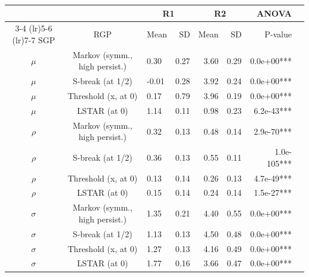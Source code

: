 \begin{table}[t]
\fontsize{8pt}{8pt}\selectfont
\begin{tabular*}{\linewidth}{@{\extracolsep{\fill}}cclrrrrl}
\toprule
 &  & \multicolumn{2}{c}{R1} & \multicolumn{2}{c}{R2} & ANOVA \\ 
\cmidrule(lr){3-4} \cmidrule(lr){5-6} \cmidrule(lr){7-7}
SGP & RGP & Mean & SD & Mean & SD & P-value \\ 
\midrule\addlinespace[2.5pt]
\ensuremath{\mu}   & Markov (symm., high persist.) & 0.30 & 0.27 & 3.60 & 0.29 & 0.0e+00*** \\ 
\ensuremath{\mu}   & S-break (at 1/2) & -0.01 & 0.28 & 3.92 & 0.24 & 0.0e+00*** \\ 
\ensuremath{\mu}   & Threshold (x, at 0) & 0.17 & 0.79 & 3.96 & 0.19 & 0.0e+00*** \\ 
\ensuremath{\mu}   & LSTAR (at 0) & 1.14 & 0.11 & 0.98 & 0.23 & 6.2e-43*** \\ 
\ensuremath{\rho}  & Markov (symm., high persist.) & 0.32 & 0.13 & 0.48 & 0.14 & 2.9e-70*** \\ 
\ensuremath{\rho}  & S-break (at 1/2) & 0.36 & 0.13 & 0.55 & 0.11 & 1.0e-105*** \\ 
\ensuremath{\rho}  & Threshold (x, at 0) & 0.13 & 0.14 & 0.26 & 0.13 & 4.7e-49*** \\ 
\ensuremath{\rho}  & LSTAR (at 0) & 0.15 & 0.14 & 0.24 & 0.14 & 1.5e-27*** \\ 
\ensuremath{\sigma} & Markov (symm., high persist.) & 1.35 & 0.21 & 4.40 & 0.55 & 0.0e+00*** \\ 
\ensuremath{\sigma} & S-break (at 1/2) & 1.13 & 0.13 & 4.50 & 0.48 & 0.0e+00*** \\ 
\ensuremath{\sigma} & Threshold (x, at 0) & 1.27 & 0.13 & 4.16 & 0.49 & 0.0e+00*** \\ 
\ensuremath{\sigma} & LSTAR (at 0) & 1.77 & 0.16 & 3.66 & 0.47 & 0.0e+00*** \\ 
\bottomrule
\end{tabular*}
\end{table}
